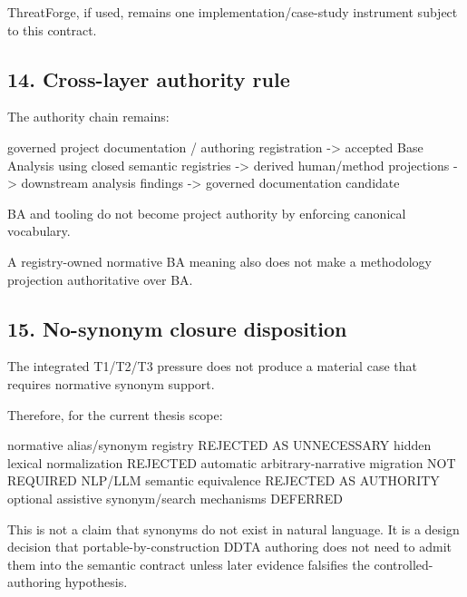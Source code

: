 \documentclass[
  10pt,
  a4paper,
]{article}
\newenvironment{Shaded}{}{}
\newcommand{\NormalTok}[1]{#1}
\begin{document}
ThreatForge, if used, remains one implementation/case-study instrument
subject to this contract.

\subsection{14. Cross-layer authority
rule}\label{14-cross-layer-authority-rule}

The authority chain remains:

\begin{Shaded}
\begin{Highlighting}[]
\NormalTok{governed project documentation / authoring registration}
\NormalTok{    {-}\textgreater{} accepted Base Analysis using closed semantic registries}
\NormalTok{        {-}\textgreater{} derived human/method projections}
\NormalTok{            {-}\textgreater{} downstream analysis findings}
\NormalTok{                {-}\textgreater{} governed documentation candidate}
\end{Highlighting}
\end{Shaded}

BA and tooling do not become project authority by enforcing canonical
vocabulary.

A registry-owned normative BA meaning also does not make a methodology
projection authoritative over BA.

\subsection{15. No-synonym closure
disposition}\label{15-no-synonym-closure-disposition}

The integrated T1/T2/T3 pressure does not produce a material case that
requires normative synonym support.

Therefore, for the current thesis scope:

\begin{Shaded}
\begin{Highlighting}[]
\NormalTok{normative alias/synonym registry                 REJECTED AS UNNECESSARY}
\NormalTok{hidden lexical normalization                    REJECTED}
\NormalTok{automatic arbitrary{-}narrative migration         NOT REQUIRED}
\NormalTok{NLP/LLM semantic equivalence                    REJECTED AS AUTHORITY}
\NormalTok{optional assistive synonym/search mechanisms    DEFERRED}
\end{Highlighting}
\end{Shaded}

This is not a claim that synonyms do not exist in natural language. It
is a design decision that portable-by-construction DDTA authoring does
not need to admit them into the semantic contract unless later evidence
falsifies the controlled-authoring hypothesis.
\end{document}
